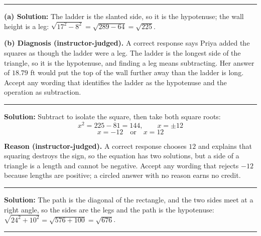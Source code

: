 \documentclass[12pt]{article}
\begin{document}
\vspace{0.2cm}

\noindent\rule{\linewidth}{0.2pt}


\textbf{(a) Solution:} \quad The ladder is the slanted side, so it is the hypotenuse; the wall
height is a leg: $\sqrt{17^2 - 8^2} = \sqrt{289 - 64} = \sqrt{225}$.

\textbf{(b) Diagnosis (instructor-judged).} A correct response says Priya added the squares as
though the ladder were a leg. The ladder is the longest side of the triangle, so it is the
hypotenuse, and finding a leg means subtracting. Her answer of $18.79$ ft would put the top of
the wall further away than the ladder is long. Accept any wording that identifies the ladder as
the hypotenuse and the operation as subtraction.

\vspace{0.2cm}

\noindent\rule{\linewidth}{0.2pt}


\textbf{Solution:} \quad Subtract to isolate the square, then take both square roots:
\[ x^2 = 225 - 81 = 144, \qquad x = \pm 12 \]
\[ \boxed{x = -12 \quad \text{or} \quad x = 12} \]

\textbf{Reason (instructor-judged).} A correct response chooses $12$ and explains that squaring
destroys the sign, so the equation has two solutions, but a side of a triangle is a length and
cannot be negative. Accept any wording that rejects $-12$ because lengths are positive; a circled
answer with no reason earns no credit.

\vspace{0.2cm}

\noindent\rule{\linewidth}{0.2pt}


\textbf{Solution:} \quad The path is the diagonal of the rectangle, and the two sides meet at a
right angle, so the sides are the legs and the path is the hypotenuse:
$\sqrt{24^2 + 10^2} = \sqrt{576 + 100} = \sqrt{676}$. 

\vspace{0.2cm}

\noindent\rule{\linewidth}{0.2pt}
\end{document}
